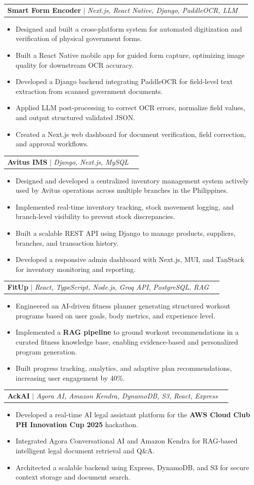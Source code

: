 \documentclass[letterpaper,11pt]{article}
\makeatletter
\newcommand{\resumeItem}[1]{
  \item\small{
    {#1 \vspace{-2pt}}
  }
}
\newcommand{\resumeProjectHeading}[2]{
    \item
    \begin{tabular*}{0.97\textwidth}{l@{\extracolsep{\fill}}r}
      \small#1 & #2 \\
    \end{tabular*}\vspace{-7pt}
}
\newcommand{\resumeItemListStart}{\begin{itemize}}
\newcommand{\resumeItemListEnd}{\end{itemize}\vspace{-5pt}}
\makeatother
\begin{document}
  \resumeProjectHeading
    {\textbf{Smart Form Encoder} $|$ \emph{Next.js, React Native, Django, PaddleOCR, LLM}}{}
    \resumeItemListStart
      \resumeItem{Designed and built a cross-platform system for automated digitization and verification of physical government forms.}
      \resumeItem{Built a React Native mobile app for guided form capture, optimizing image quality for downstream OCR accuracy.}
      \resumeItem{Developed a Django backend integrating PaddleOCR for field-level text extraction from scanned government documents.}
      \resumeItem{Applied LLM post-processing to correct OCR errors, normalize field values, and output structured validated JSON.}
      \resumeItem{Created a Next.js web dashboard for document verification, field correction, and approval workflows.}
    \resumeItemListEnd

  \resumeProjectHeading
    {\textbf{Avitus IMS} $|$ \emph{Django, Next.js, MySQL}}{}
    \resumeItemListStart
      \resumeItem{Designed and developed a centralized inventory management system actively used by Avitus operations across multiple branches in the Philippines.}
      \resumeItem{Implemented real-time inventory tracking, stock movement logging, and branch-level visibility to prevent stock discrepancies.}
      \resumeItem{Built a scalable REST API using Django to manage products, suppliers, branches, and transaction history.}
      \resumeItem{Developed a responsive admin dashboard with Next.js, MUI, and TanStack for inventory monitoring and reporting.}
    \resumeItemListEnd

  \resumeProjectHeading
    {\textbf{FitUp} $|$ \emph{React, TypeScript, Node.js, Groq API, PostgreSQL, RAG}}{}
    \resumeItemListStart
      \resumeItem{Engineered an AI-driven fitness planner generating structured workout programs based on user goals, body metrics, and experience level.}
      \resumeItem{Implemented a \textbf{RAG pipeline} to ground workout recommendations in a curated fitness knowledge base, enabling evidence-based and personalized program generation.}
      \resumeItem{Built progress tracking, analytics, and adaptive plan recommendations, increasing user engagement by 40\%.}
    \resumeItemListEnd

  \resumeProjectHeading
    {\textbf{AckAI} $|$ \emph{Agora AI, Amazon Kendra, DynamoDB, S3, React, Express}}{}
    \resumeItemListStart
      \resumeItem{Developed a real-time AI legal assistant platform for the \textbf{AWS Cloud Club PH Innovation Cup 2025} hackathon.}
      \resumeItem{Integrated Agora Conversational AI and Amazon Kendra for RAG-based intelligent legal document retrieval and Q\&A.}
      \resumeItem{Architected a scalable backend using Express, DynamoDB, and S3 for secure context storage and document search.}
    \resumeItemListEnd
\end{document}

